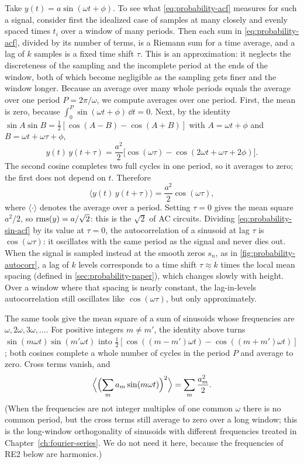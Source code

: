 Take $y(t)=a\sin(\omega t+\phi)$. To see what \cref{eq:probability-acf} measures for such a signal, consider first the idealized case of samples at many closely and evenly spaced times $t_i$ over a window of many periods. Then each sum in \cref{eq:probability-acf}, divided by its number of terms, is a Riemann sum for a time average, and a lag of $k$ samples is a fixed time shift $\tau$. This is an approximation: it neglects the discreteness of the sampling and the incomplete period at the ends of the window, both of which become negligible as the sampling gets finer and the window longer. Because an average over many whole periods equals the average over one period $P=2\pi/\omega$, we compute averages over one period. First, the mean is zero, because $\int_0^P\sin(\omega t+\phi)\,\dd t=0$. Next, by the identity $\sin A\sin B=\tfrac12[\cos(A-B)-\cos(A+B)]$ with $A=\omega t+\phi$ and $B=\omega t+\omega\tau+\phi$,
\[
y(t)\,y(t+\tau) = \frac{a^2}{2}\bigl[\cos(\omega\tau) - \cos(2\omega t+\omega\tau+2\phi)\bigr].
\]
The second cosine completes two full cycles in one period, so it averages to zero; the first does not depend on $t$. Therefore
\begin{equation}
\langle y(t)\,y(t+\tau)\rangle = \frac{a^2}{2}\cos(\omega\tau),
\label{eq:probability-sin-acf}
\end{equation}
where $\langle\cdot\rangle$ denotes the average over a period. Setting $\tau=0$ gives the mean square $a^2/2$, so $\mathrm{rms}(y)=a/\sqrt2$: this is the $\sqrt2$ of AC circuits. Dividing \cref{eq:probability-sin-acf} by its value at $\tau=0$, the autocorrelation of a sinusoid at lag $\tau$ is $\cos(\omega\tau)$: it oscillates with the same period as the signal and never dies out. When the signal is sampled instead at the smooth zeros $s_n$, as in \cref{fig:probability-autocorr}, a lag of $k$ levels corresponds to a time shift $\tau\approx k$ times the local mean spacing (defined in \cref{sec:probability-paper}), which changes slowly with height. Over a window where that spacing is nearly constant, the lag-in-levels autocorrelation still oscillates like $\cos(\omega\tau)$, but only approximately.

The same tools give the mean square of a sum of sinusoids whose frequencies are $\omega,2\omega,3\omega,\dots$. For positive integers $m\neq m'$, the identity above turns $\sin(m\omega t)\sin(m'\omega t)$ into $\tfrac12[\cos((m-m')\omega t)-\cos((m+m')\omega t)]$; both cosines complete a whole number of cycles in the period $P$ and average to zero. Cross terms vanish, and
\begin{equation}
\Bigl\langle \Bigl(\sum_m a_m\sin(m\omega t)\Bigr)^2\Bigr\rangle = \sum_m\frac{a_m^2}{2}.
\label{eq:probability-sum-ms}
\end{equation}
(When the frequencies are not integer multiples of one common $\omega$ there is no common period, but the cross terms still average to zero over a long window; this is the long-window orthogonality of sinusoids with different frequencies treated in Chapter~\ref{ch:fourier-series}. We do not need it here, because the frequencies of RE2 below are harmonics.)

